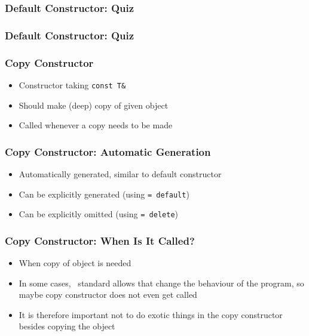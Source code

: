 \begin{frame}
  \frametitle{Default Constructor: Quiz}
\end{frame}

\begin{frame}
  \frametitle{Default Constructor: Quiz}
\end{frame}

\begin{frame}
  \frametitle{Copy Constructor}
  \begin{itemize}
    \item Constructor taking {\tt const T\&}
    \item Should make (deep) copy of given object
    \item Called whenever a copy needs to be made
  \end{itemize}
  \vskip5mm
\end{frame}

\begin{frame}
  \frametitle{Copy Constructor: Automatic Generation}
  \begin{itemize}
    \item Automatically generated, similar  to default constructor
    \item Can be explicitly generated (using {\tt = default})
    \item Can be explicitly omitted (using {\tt = delete})
  \end{itemize}
\end{frame}

\begin{frame}
  \frametitle{Copy Constructor: When Is It Called?}
  \begin{itemize}
    \item When copy of object is needed
    \item In some cases, \cpp\ standard allows 
          that change the behaviour of the program, so maybe copy constructor does not even get called
    \item It is therefore important not to do exotic things in the copy constructor besides copying the object
  \end{itemize}
\end{frame}

